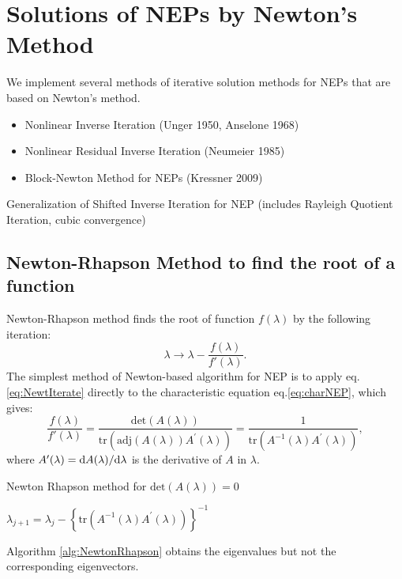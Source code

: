\documentclass[11pt,letterpaper]{article}
\begin{document}
\pagebreak
\section{Solutions of NEPs by Newton's Method }
We implement several methods of iterative solution methods for NEPs that are based on Newton's method. 
\begin{itemize}
\item Nonlinear Inverse Iteration (Unger 1950, Anselone 1968)
\item Nonlinear Residual Inverse Iteration (Neumeier 1985)
\item Block-Newton Method for NEPs (Kressner 2009)
\end{itemize}
Generalization of Shifted Inverse Iteration for NEP (includes Rayleigh Quotient Iteration, cubic convergence) \\
\subsection{Newton-Rhapson Method to find the root of a function}
Newton-Rhapson method finds the root of function $f(\lambda)$ by the following iteration:
\begin{equation}
	\label{eq:NewtIterate}
	\lambda \rightarrow \lambda - \frac{f(\lambda)}{f'(\lambda)}.
\end{equation}
The simplest method of Newton-based algorithm for NEP is to apply eq.\ref{eq:NewtIterate} directly to the characteristic equation eq.\ref{eq:charNEP}, which gives:
\begin{equation}\label{eq:NewtonRhapson}
\frac{f(\lambda)}{f'(\lambda)} = \frac{\mathrm{det}(A(\lambda))}{ \mathrm{tr} \left( \mathrm{adj}(A(\lambda))A^{\prime}(\lambda)\right)} = \frac{1}{ \mathrm{tr}\left( A^{-1}(\lambda)A^{\prime}(\lambda)\right)},
\end{equation}
where $A^{\prime}(\lambda)=\mathrm{d} A(\lambda)/\mathrm{d} \lambda$ is the derivative of $A$ in $\lambda$. 
\begin{algorithm}
\caption{Newton Rhapson method for $\mathrm{det}(A(\lambda))=0$}
\label{alg:NewtonRhapson}
\begin{algorithmic}
\STATE $\lambda_{j+1} = \lambda_j - \left\lbrace \mathrm{tr}\left( A^{-1}(\lambda)A^{\prime}(\lambda)\right)\right\rbrace^{-1} $
\ENDFOR
\end{algorithmic}
\end{algorithm}
Algorithm \ref{alg:NewtonRhapson} obtains the eigenvalues but not the corresponding eigenvectors.
\end{document}
